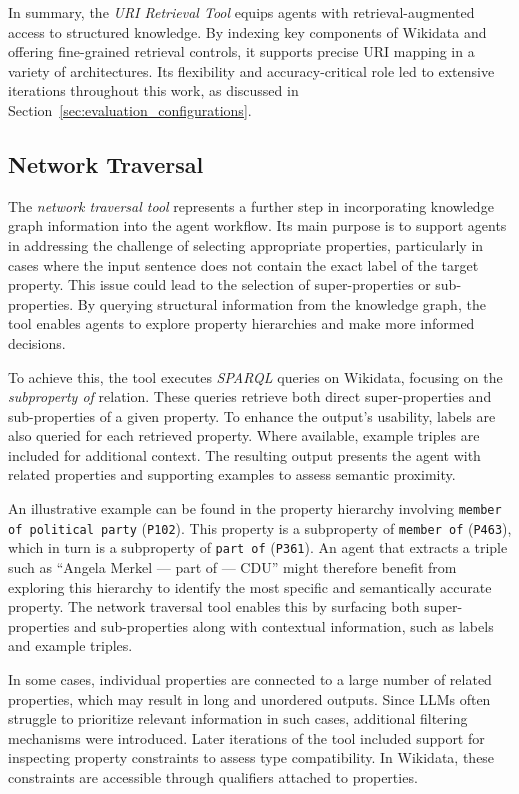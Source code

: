 \documentclass[a4paper,oneside,bibliography=totoc]{scrbook}
\begin{document}
In summary, the \textit{URI Retrieval Tool} equips agents with retrieval-augmented access to structured knowledge. By indexing key components of Wikidata and offering fine-grained retrieval controls, it supports precise URI mapping in a variety of architectures. Its flexibility and accuracy-critical role led to extensive iterations throughout this work, as discussed in Section~\ref{sec:evaluation_configurations}.

\subsection{Network Traversal}
\label{subsec:network_traversal}

The \textit{network traversal tool} represents a further step in incorporating knowledge graph information into the agent workflow. Its main purpose is to support agents in addressing the challenge of selecting appropriate properties, particularly in cases where the input sentence does not contain the exact label of the target property. This issue could lead to the selection of super-properties or sub-properties. By querying structural information from the knowledge graph, the tool enables agents to explore property hierarchies and make more informed decisions.

To achieve this, the tool executes \textit{SPARQL} queries on Wikidata, focusing on the \textit{subproperty of} relation. These queries retrieve both direct super-properties and sub-properties of a given property. To enhance the output's usability, labels are also queried for each retrieved property. Where available, example triples are included for additional context. The resulting output presents the agent with related properties and supporting examples to assess semantic proximity.

An illustrative example can be found in the property hierarchy involving \texttt{member of political party} (\texttt{P102}). This property is a subproperty of \texttt{member of} (\texttt{P463}), which in turn is a subproperty of \texttt{part of} (\texttt{P361}). An agent that extracts a triple such as “Angela Merkel — part of — CDU” might therefore benefit from exploring this hierarchy to identify the most specific and semantically accurate property. The network traversal tool enables this by surfacing both super-properties and sub-properties along with contextual information, such as labels and example triples.

In some cases, individual properties are connected to a large number of related properties, which may result in long and unordered outputs. Since \acp{LLM} often struggle to prioritize relevant information in such cases, additional filtering mechanisms were introduced. Later iterations of the tool included support for inspecting property constraints to assess type compatibility. In Wikidata, these constraints are accessible through qualifiers attached to properties.
\end{document}
